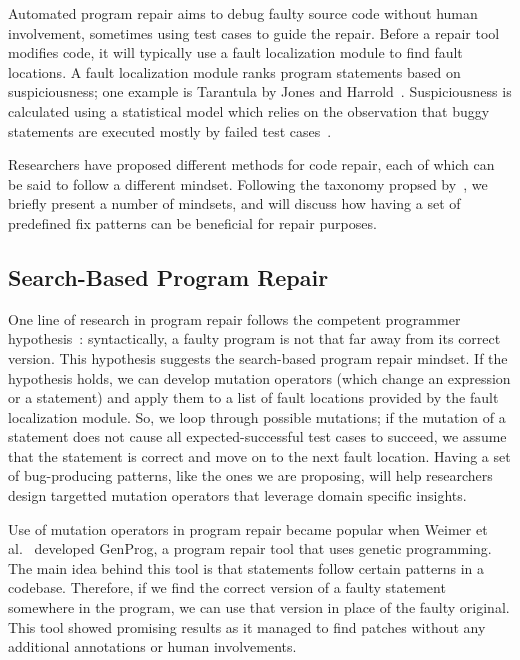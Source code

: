 Automated program repair aims to debug faulty source code without human involvement, sometimes using test cases to guide the repair. Before a repair tool modifies code, it will typically use a fault localization module to find fault locations. A fault localization module ranks program statements based on suspiciousness; one example is Tarantula by Jones and Harrold~\cite{jones2005empirical}. Suspiciousness is calculated using a statistical model which relies on the observation that buggy statements are executed mostly by failed test cases~\cite{naish2009spectral,xie2013theoretical}.

Researchers have proposed different methods for code repair, each of which can be said to follow a different mindset. Following the taxonomy propsed by~\cite{liu2018survey}, we briefly present a number of mindsets, and will discuss how having a set of predefined fix patterns can be beneficial for repair purposes.

\subsection{Search-Based Program Repair}
One line of research in program repair follows the competent programmer hypothesis~\cite{gopinath2014mutant}: syntactically, a faulty program is not that far away from its correct version. This hypothesis suggests the search-based program repair mindset. If the hypothesis holds, we can develop mutation operators (which change an expression or a statement) and apply them to a list of fault locations provided by the fault localization module. So, we loop through possible mutations; if the mutation of a statement does not cause all expected-successful test cases to succeed, we assume that the statement is correct and move on to the next fault location. Having a set of bug-producing patterns, like the ones we are proposing, will help researchers design targetted mutation operators that leverage domain specific insights.

Use of mutation operators in program repair became popular when Weimer et al.~\cite{forrest2009genetic,nguyen2009using} developed GenProg, a program repair tool that uses genetic programming. The main idea behind this tool is that statements follow certain patterns in a codebase. Therefore, if we find the correct version of a faulty statement somewhere in the program, we can use that version in place of the faulty original. This tool showed promising results as it managed to find patches without any additional annotations or human involvements.


